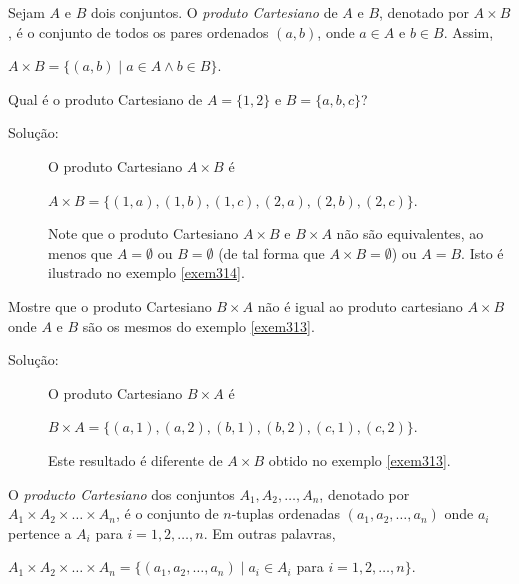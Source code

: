 \begin{defn}
\label{def38}
Sejam $A$ e $B$ dois conjuntos. O \emph{produto Cartesiano} de $A$ e $B$,
denotado por $A \times B$, é o conjunto de todos os pares ordenados $(a, b)$,
onde $a \in A$ e $b \in B$. Assim,
\begin{center}
$A \times B = \{(a,b) \mid a \in A \land b \in B\}.$
\end{center}
\end{defn}

\begin{exmp}
\label{exem313}
Qual é o produto Cartesiano de $A = \{1,2\}$ e $B = \{a,b,c\}$?
\begin{description}
\item[Solução:]O produto Cartesiano $A \times B$ é
\begin{center}
$A \times B = \{(1,a), (1,b), (1,c), (2,a), (2,b), (2,c)\}$.
\end{center}
Note que o produto Cartesiano $A \times B$ e $B \times A$ não são equivalentes,
ao menos que $A = \emptyset$ ou $B = \emptyset$ (de tal forma que $A \times B
= \emptyset$) ou $A = B$. Isto é ilustrado no exemplo \ref{exem314}.
\end{description}
\end{exmp}

\begin{exmp}
\label{exem314}
Mostre que o produto Cartesiano $B \times A$ não é igual ao produto cartesiano
$A \times B$ onde $A$ e $B$ são os mesmos do exemplo \ref{exem313}.
\begin{description}
\item[Solução:] O produto Cartesiano $B \times A$ é
\begin{center}
$B \times A = \{(a,1), (a,2), (b,1), (b,2),(c,1),(c,2)\}$.
\end{center}
Este resultado é diferente de $A \times B$ obtido no exemplo \ref{exem313}.
\end{description}
\end{exmp}

\begin{defn}
\label{def39}
O \emph{producto Cartesiano} dos conjuntos $A_1, A_2, \ldots, A_n$, denotado por
$A_1 \times A_2 \times \ldots \times A_n$, é o conjunto de
$n$-tuplas ordenadas $(a_1, a_2, \ldots,a_n)$ onde $a_i$ pertence a $A_i$ para
$i = 1,2,\ldots,n$. Em outras palavras,
\begin{center}
$A_1 \times A_2 \times \ldots \times A_n = \{(a_1, a_2,\ldots,a_n) \mid a_i \in
A_i$ para $i = 1,2,\ldots,n\}$.
\end{center}
\end{defn}

